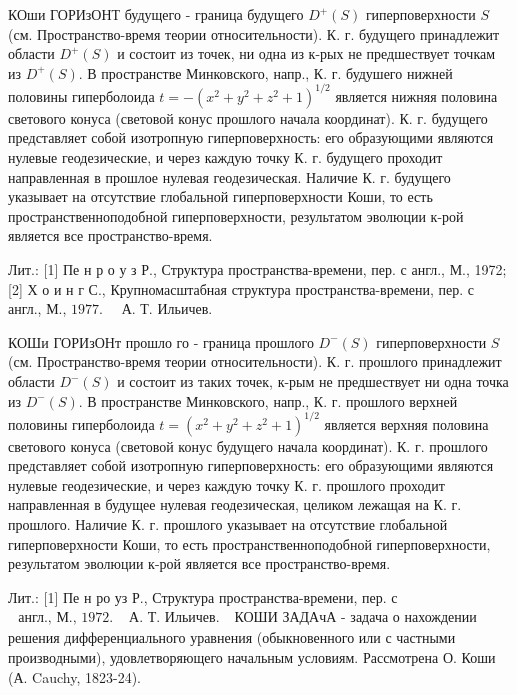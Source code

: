 \documentclass[10pt]{article}
\begin{document}
КОши ГОРИзОНТ будущего - граница будущего $D^{+}(S)$ гиперповерхности $S$ (см. Пространство-время теории относительности). К. г. будущего принадлежит области $D^{+}(S)$ и состоит из точек, ни одна из к-рых не предшествует точкам из $D^{+}(S)$. В пространстве Минковского, напр., К. г. будушего нижней половины гиперболоида $t=-\left(x^{2}+y^{2}+z^{2}+1\right)^{1 / 2}$ является нижняя половина светового конуса (световой конус прошлого начала координат). К. г. будущего представляет собой изотропную гиперповерхность: его образующими являются нулевые геодезические, и через каждую точку К. г. будущего проходит направленная в прошлое нулевая геодезическая. Наличие К. г. будущего указывает на отсутствие глобальной гиперповерхности Коши, то есть пространственноподобной гиперповерхности, результатом эволюции к-рой является все пространство-время.



Лит.: [1] Пе н р о у з Р., Структура пространства-времени, пер. с англ., М., 1972; [2] Х о и н г С., Крупномасштабная структура пространства-времени, пер. с англ., М., $1977 . \quad$ А. Т. Ильичев.



КОШи ГОРИзОНт прошло го - граница прошлого $D^{-}(S)$ гиперповерхности $S$ (см. Пространство-время теории относительности). К. г. прошлого принадлежит области $D^{-}(S)$ и состоит из таких точек, к-рым не предшествует ни одна точка из $D^{-}(S)$. В пространстве Минковского, напр., К. г. прошлого верхней половины гиперболоида $t=\left(x^{2}+y^{2}+z^{2}+1\right)^{1 / 2}$ является верхняя половина светового конуса (световой конус будущего начала координат). К. г. прошлого представляет собой изотропную гиперповерхность: его образующими являются нулевые геодезические, и через каждую точку К. г. прошлого проходит направленная в будущее нулевая геодезическая, целиком лежащая на К. г. прошлого. Наличие К. г. прошлого указывает на отсутствие глобальной гиперповерхности Коши, то есть пространственноподобной гиперповерхности, результатом эволюции к-рой является все пространство-время.



Лит.: [1] Пе н ро уз Р., Структура пространства-времени, пер. с $\begin{array}{ll}\text { англ., М., } 1972 . & \text { А. Т. Ильичев. }\end{array}$ КОШИ ЗАДАчА - задача о нахождении решения дифференциального уравнения (обыкновенного или с частными производными), удовлетворяющего начальным условиям. Рассмотрена О. Коши (А. Cauchy, 1823-24).
\end{document}
